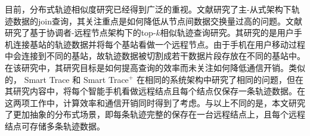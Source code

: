   		目前，分布式轨迹相似度研究已经得到广泛的重视。文献\cite{setSimilar,kimICDE2012}研究了主-从式架构下轨迹数据的join查询，其关注重点是如何降低从节点间数据交换量过高的问题。文献\cite{KDDSimilarity} 研究了基于协调者-远程节点架构下的top-$k$相似轨迹查询研究。其研究的是用户手机连接基站的轨迹数据并将每个基站看做一个远程节点。由于手机在用户移动过程中会连接到不同的基站，故轨迹数据被切割成若干数据片段存放在不同的基站中。在该研究中，其研究目标是如何提高查询的效率而未关注如何降低通信开销。类似的，
Smart Trace\cite{SmartTrace} 和 Smart Trace$^{+}$ \cite{crowdsourced} 在相同的系统架构中研究了相同的问题，但在其研究内容中，将每个智能手机看做远程结点且每个结点仅保存一条轨迹数据。在这两项工作中，计算效率和通信开销同时得到了考虑。与以上不同的是，本文研究了更加抽象的分布式场景，即每条轨迹完整的保存在一台远程结点上，且每个远程结点可存储多条轨迹数据。
  
  		                                                                                              

